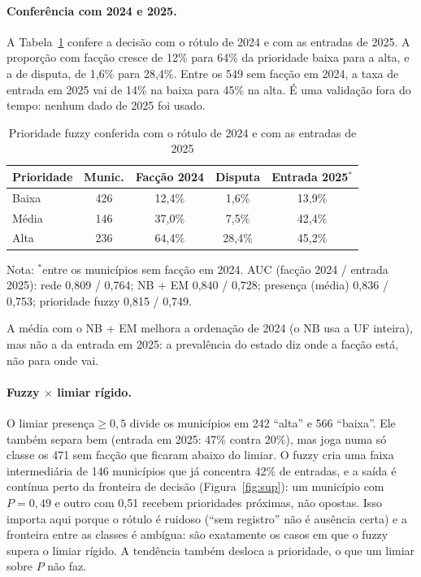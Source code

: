 \documentclass[article,12pt,oneside,a4paper,brazil,sumario=tradicional]{abntex2}
\newcommand{\fonteautores}{\fonte{Elaborada pelos autores (2026).}}
\begin{document}
\paragraph{Conferência com 2024 e 2025.} A Tabela~\ref{tab:fuzzy} confere a decisão com o
rótulo de 2024 e com as entradas de 2025. A proporção com facção cresce de 12\% para 64\% da
prioridade baixa para a alta, e a de disputa, de 1,6\% para 28,4\%. Entre os 549 sem facção
em 2024, a taxa de entrada em 2025 vai de 14\% na baixa para 45\% na alta. É uma validação
fora do tempo: nenhum dado de 2025 foi usado.

\begin{table}[htbp]
\centering\small
\caption{Prioridade fuzzy conferida com o rótulo de 2024 e com as entradas de 2025}\label{tab:fuzzy}
\begin{tabular}{@{}lcccc@{}}
\toprule
Prioridade & Munic. & Facção 2024 & Disputa & Entrada 2025$^*$\\
\midrule
Baixa & 426 & 12,4\% & 1,6\% & 13,9\%\\
Média & 146 & 37,0\% & 7,5\% & 42,4\%\\
Alta & 236 & 64,4\% & 28,4\% & 45,2\%\\
\bottomrule
\end{tabular}
\begin{flushleft}\footnotesize
Nota: $^*$entre os municípios sem facção em 2024. AUC (facção 2024 / entrada 2025): rede
0,809 / 0,764; NB + EM 0,840 / 0,728; presença (média) 0,836 / 0,753; prioridade fuzzy
0,815 / 0,749.
\end{flushleft}
\fonteautores
\end{table}

A média com o NB + EM melhora a ordenação de 2024 (o NB usa a UF inteira), mas não a da
entrada em 2025: a prevalência do estado diz onde a facção está, não para onde vai.

\paragraph{Fuzzy $\times$ limiar rígido.} O limiar presença${}\ge0{,}5$ divide os municípios
em 242 ``alta'' e 566 ``baixa''. Ele também separa bem (entrada em 2025: 47\% contra 20\%),
mas joga numa só classe os 471 sem facção que ficaram abaixo do limiar. O fuzzy cria uma
faixa intermediária de 146 municípios que já concentra 42\% de entradas, e a saída é contínua
perto da fronteira de decisão (Figura~\ref{fig:sup}): um município com $P=0{,}49$ e outro
com 0,51 recebem prioridades próximas, não opostas. Isso importa aqui porque o rótulo é
ruidoso (``sem registro'' não é ausência certa) e a fronteira entre as classes é ambígua:
são exatamente os casos em que o fuzzy supera o limiar rígido. A tendência também desloca a
prioridade, o que um limiar sobre $P$ não faz.
\end{document}
